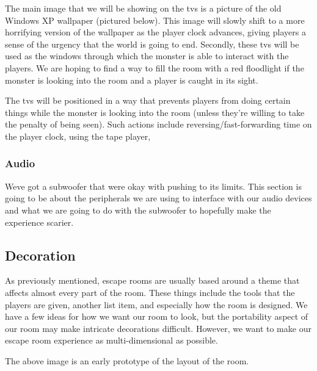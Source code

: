 \documentclass[conference]{IEEEtran}
\begin{document}
The main image that we will be showing on the tvs is a picture of the old Windows XP wallpaper (pictured below).
This image will slowly shift to a more horrifying version of the wallpaper as the player clock advances, giving
players a sense of the urgency that the world is going to end. Secondly, these tvs will be used as the windows
through which the monster is able to interact with the players. We are hoping to find a way to fill the room
with a red floodlight if the monster is looking into the room and a player is caught in its sight. %

The tvs will be positioned in a way that prevents players from doing certain things while the monster is
looking into the room (unless they're willing to take the penalty of being seen).
Such actions include reversing/fast-forwarding time on the player clock, using the tape player, %

\subsubsection*{Audio}
Weve got a subwoofer that were okay with pushing to its limits. This section is going to be about the peripherals we are using
to interface with our audio devices and what we are going to do with the subwoofer to hopefully make the experience scarier.

\subsection*{Decoration}
As previously mentioned, escape rooms are usually based around a theme that affects almost
every part of the room. These things include the tools that the players are given, another list item,
and especially how the room is designed. We have a few ideas for how we want our room to look, but
the portability aspect of our room may make intricate decorations difficult. However, we want to make
our escape room experience as multi-dimensional as possible.

The above image is an early prototype of the layout of the room.
\end{document}
